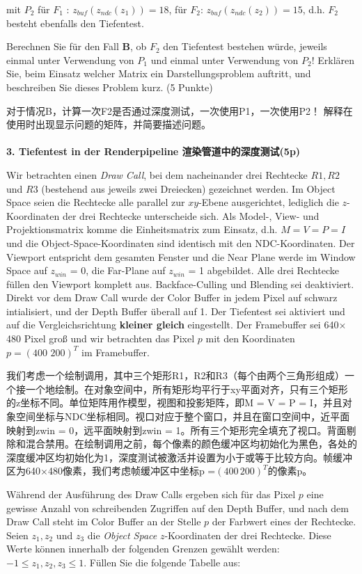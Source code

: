 \documentclass[fleqn]{article}
\begin{document}
mit $P_2$ für $F_1$ : $z_{buf}(z_{ndc}(z_1))=18$, für $F_2$: $z_{buf}(z_{ndc}(z_2))=15$, d.h. $F_2$ besteht ebenfalls den Tiefentest.

Berechnen Sie für den Fall \textbf{B}, ob $F_2$ den Tiefentest bestehen würde,
 jeweils einmal unter Verwendung von $P_1$ und einmal unter Verwendung von $P_2$! 
 Erklären Sie, beim Einsatz welcher Matrix ein Darstellungsproblem auftritt, und beschreiben Sie dieses Problem kurz. (5 Punkte)

 对于情况B，计算一次F2是否通过深度测试，一次使用P1，一次使用P2！ 解释在使用时出现显示问题的矩阵，并简要描述问题。
 \\
\\
\noindent\textbf{3. Tiefentest in der Renderpipeline 渲染管道中的深度测试(5p)}

Wir betrachten einen \textit{Draw Call}, bei dem nacheinander drei Rechtecke $R1,R2$ und $R3$
 (bestehend aus jeweils zwei Dreiecken) gezeichnet werden. 
 Im Object Space seien die Rechtecke alle parallel zur $xy$-Ebene ausgerichtet, 
 lediglich die $z$-Koordinaten der drei Rechtecke unterscheide sich. Als Model-, View- 
 und Projektionsmatrix komme die Einheitsmatrix zum Einsatz, d.h. $M = V = P = I$ 
 und die Object-Space-Koordinaten sind identisch mit den NDC-Koordinaten. 
 Der Viewport entspricht dem gesamten Fenster und die Near Plane werde im Window Space auf 
 $z_{win}$ = 0, die Far-Plane auf $z_{win}$ = 1 abgebildet. 
 Alle drei Rechtecke füllen den Viewport komplett aus. Backface-Culling und Blending sei 
 deaktiviert. Direkt vor dem Draw Call wurde der Color Buffer in jedem Pixel auf 
 schwarz intialisiert, und der Depth Buffer überall auf 1. Der Tiefentest sei aktiviert 
 und auf die Vergleichsrichtung \textbf{kleiner gleich} eingestellt. 
 Der Framebuffer sei 640$\times$480 Pixel groß und wir betrachten das Pixel $p$ mit den Koordinaten 
$p=(400\,\,200)^T$ im Framebuffer.

我们考虑一个绘制调用，其中三个矩形R1，R2和R3（每个由两个三角形组成）一个接一个地绘制。在对象空间中，所有矩形均平行于xy平面对齐，只有三个矩形的z坐标不同。单位矩阵用作模型，视图和投影矩阵，即M = V = P = I，并且对象空间坐标与NDC坐标相同。视口对应于整个窗口，并且在窗口空间中，近平面映射到zwin = 0，远平面映射到zwin = 1。所有三个矩形完全填充了视口。背面剔除和混合禁用。在绘制调用之前，每个像素的颜色缓冲区均初始化为黑色，各处的深度缓冲区均初始化为1，深度测试被激活并设置为小于或等于比较方向。帧缓冲区为640$\times$480像素，我们考虑帧缓冲区中坐标p =$(400\, 200)^T$的像素p。

Während der Ausführung des Draw Calls ergeben sich für das Pixel $p$ eine gewisse Anzahl
 von schreibenden Zugriffen auf den Depth Buffer, und nach dem Draw Call steht im Color 
 Buffer an der Stelle $p$ der Farbwert eines der Rechtecke. Seien $z_1, z_2$ und $z_3$ die 
 \textit{Object Space} $z$-Koordinaten der drei Rechtecke. Diese Werte können innerhalb 
 der folgenden Grenzen gewählt werden: $−1 \leq z_1, z_2, z_3 \leq 1$. Füllen Sie die folgende Tabelle aus:
\end{document}
